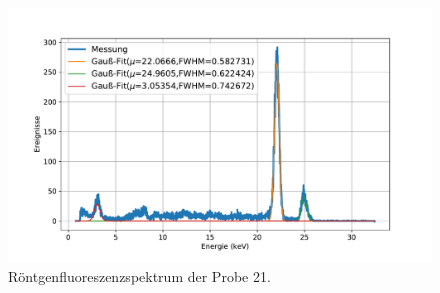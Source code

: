 \documentclass[
	a4paper,
	12pt,
	pagesize,
	ngerman
]{scrartcl}
\begin{document}
\begin{figure}[H]
		\includegraphics[width=\textwidth]{images/21-Ag.pdf}
		\centering
		\caption{Röntgenfluoreszenzspektrum der Probe 21.}
	\end{figure}
\end{document}
